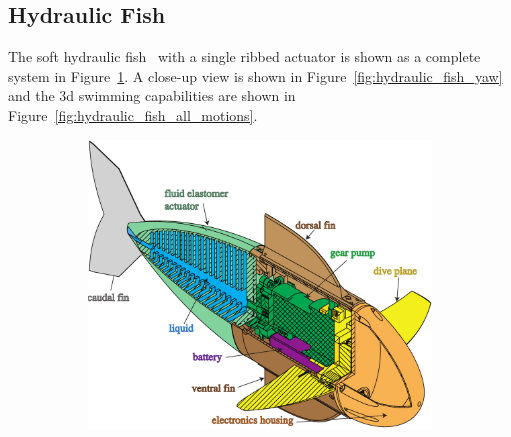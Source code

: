 \subsection{Hydraulic Fish}
\label{subsec:Locomotion, Hydraulic Fish}
The soft hydraulic fish~\cite{katzschmann2014hydraulic} with a single ribbed actuator is shown as a complete system in Figure~\ref{fig:hydraulic_fish_system_overview}. A close-up view is shown in Figure~\ref{fig:hydraulic_fish_yaw} and the 3d swimming capabilities are shown in Figure~\ref{fig:hydraulic_fish_all_motions}.

\begin{figure}[htb]
        \centering
        \begin{subfigure}[b]{0.48\columnwidth}
            \centering
           \includegraphics[width=1\columnwidth]{figures/locomotion/hydraulic_fish_system_overview.pdf}
           \caption{}
            \label{fig:hydraulic_fish_system_overview}
        \end{subfigure}
        \begin{subfigure}[b]{0.48\columnwidth}
            \centering

\end{subfigure}
\end{figure}
